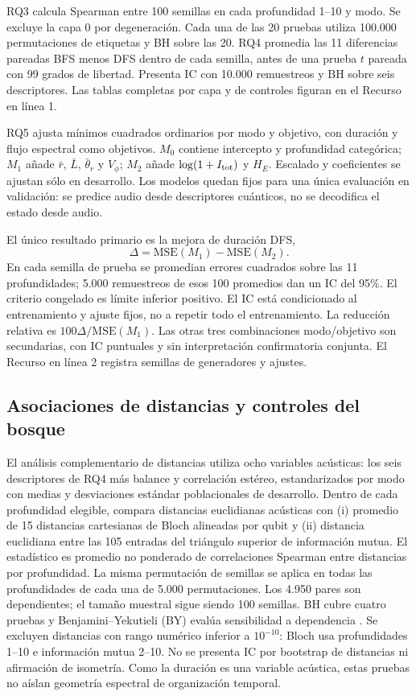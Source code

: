 \documentclass[pdflatex,iicol,sn-basic,Numbered]{sn-jnl}
\begin{document}
RQ3 calcula Spearman entre 100 semillas en cada profundidad 1--10 y modo. Se excluye la capa 0 por degeneración. Cada una de las 20 pruebas utiliza 100.000 permutaciones de etiquetas y BH sobre las 20. RQ4 promedia las 11 diferencias pareadas BFS menos DFS dentro de cada semilla, antes de una prueba $t$ pareada con 99 grados de libertad. Presenta IC con 10.000 remuestreos y BH sobre seis descriptores. Las tablas completas por capa y de controles figuran en el Recurso en línea 1.

RQ5 ajusta mínimos cuadrados ordinarios por modo y objetivo, con duración y flujo espectral como objetivos. $M_0$ contiene intercepto y profundidad categórica; $M_1$ añade $\bar r$, $\bar L$, $\bar\theta_r$ y $V_\phi$; $M_2$ añade $\log(1+I_{\rm tot})$ y $H_E$. Escalado y coeficientes se ajustan sólo en desarrollo. Los modelos quedan fijos para una única evaluación en validación: se predice audio desde descriptores cuánticos, no se decodifica el estado desde audio.

El único resultado primario es la mejora de duración DFS,
\begin{equation}
\Delta=\mathrm{MSE}(M_1)-\mathrm{MSE}(M_2).
\end{equation}
En cada semilla de prueba se promedian errores cuadrados sobre las 11 profundidades; 5.000 remuestreos de esos 100 promedios dan un IC del 95\%. El criterio congelado es límite inferior positivo. El IC está condicionado al entrenamiento y ajuste fijos, no a repetir todo el entrenamiento. La reducción relativa es $100\Delta/\mathrm{MSE}(M_1)$. Las otras tres combinaciones modo/objetivo son secundarias, con IC puntuales y sin interpretación confirmatoria conjunta. El Recurso en línea 2 registra semillas de generadores y ajustes.

\subsection{Asociaciones de distancias y controles del bosque}
El análisis complementario de distancias utiliza ocho variables acústicas: los seis descriptores de RQ4 más balance y correlación estéreo, estandarizados por modo con medias y desviaciones estándar poblacionales de desarrollo. Dentro de cada profundidad elegible, compara distancias euclidianas acústicas con (i) promedio de 15 distancias cartesianas de Bloch alineadas por qubit y (ii) distancia euclidiana entre las 105 entradas del triángulo superior de información mutua. El estadístico es promedio no ponderado de correlaciones Spearman entre distancias por profundidad. La misma permutación de semillas se aplica en todas las profundidades de cada una de 5.000 permutaciones. Los 4.950 pares son dependientes; el tamaño muestral sigue siendo 100 semillas. BH cubre cuatro pruebas y Benjamini--Yekutieli (BY) evalúa sensibilidad a dependencia \citep{Benjamini2001}. Se excluyen distancias con rango numérico inferior a $10^{-10}$: Bloch usa profundidades 1--10 e información mutua 2--10. No se presenta IC por bootstrap de distancias ni afirmación de isometría. Como la duración es una variable acústica, estas pruebas no aíslan geometría espectral de organización temporal.
\end{document}
